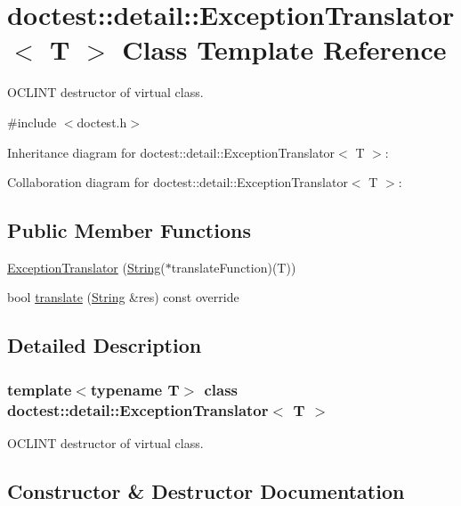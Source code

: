 \hypertarget{classdoctest_1_1detail_1_1_exception_translator}{}\section{doctest\+:\+:detail\+:\+:Exception\+Translator$<$ T $>$ Class Template Reference}
\label{classdoctest_1_1detail_1_1_exception_translator}


O\+C\+L\+I\+NT destructor of virtual class.  




{\ttfamily \#include $<$doctest.\+h$>$}



Inheritance diagram for doctest\+:\+:detail\+:\+:Exception\+Translator$<$ T $>$\+:


Collaboration diagram for doctest\+:\+:detail\+:\+:Exception\+Translator$<$ T $>$\+:
\subsection*{Public Member Functions}
\begin{DoxyCompactItemize}
\item 
\hyperlink{classdoctest_1_1detail_1_1_exception_translator_a3ac05488993c40c6ba55ce51a6bf7eae}{Exception\+Translator} (\hyperlink{classdoctest_1_1_string}{String}($\ast$translate\+Function)(T))
\item 
bool \hyperlink{classdoctest_1_1detail_1_1_exception_translator_a56484c4218a06bbbd1548335a8b64110}{translate} (\hyperlink{classdoctest_1_1_string}{String} \&res) const override
\end{DoxyCompactItemize}


\subsection{Detailed Description}
\subsubsection*{template$<$typename T$>$\newline
class doctest\+::detail\+::\+Exception\+Translator$<$ T $>$}

O\+C\+L\+I\+NT destructor of virtual class. 

\subsection{Constructor \& Destructor Documentation}
\mbox{\label{classdoctest_1_1detail_1_1_exception_translator_a3ac05488993c40c6ba55ce51a6bf7eae}} 

